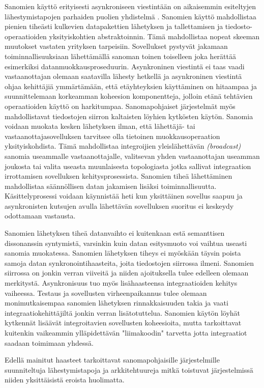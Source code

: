 Sanomien käyttö erityisesti asynkroniseen viestintään on aikaisemmin esiteltyjen lähestymistapojen parhaiden puolien yhdistelmä \citep[sivu~73]{Hohpe2004}.
Sanomien käyttö mahdollistaa pienien tiheästi kulkevien datapakettien lähetyksen ja tallettamisen ja tiedosto-operaatioiden yksityiskohtien abstraktoinnin. Tämä mahdollistaa nopeat skeeman muutokset vastaten yrityksen tarpeisiin.
Sovellukset pystyvät jakamaan toiminnallisuuksiaan lähettämällä sanoman toinen toiselleen joka herättää esimerkiksi datanmuokkausproseduurin. Asynkroninen viestintä ei taas vaadi vastaanottajan olemaan saatavilla lähesty hetkellä ja asynkroninen viestintä ohjaa kehittäjiä ymmärtämään, että etäyhteyksien käyttäminen on hitaampaa ja suunnittelemaan korkeamman koheesion komponentteja, jolloin etänä tehtävien operaatioiden käyttö on harkitumpaa.
Sanomapohjaiset järjestelmät myös mahdollistavat tiedostojen siirron kaltaisten löyhien kytkösten käytön. Sanomia voidaan muokata kesken lähetyksen ilman, että lähettäjä- tai vastaanottajasovelluksen tarvitsee olla tietoinen muokkausoperaation yksityiskohdista. Tämä mahdollistaa integroijien yleislähettävän \textit{(broadcast)} sanomia useammalle vastaanottajalle, valitsevan yhden vastaanottajan useamman joukosta tai valita useasta muunlaisesta topologiasta jotka sallivat integraation irrottamisen sovelluksen kehitysprosessista. 
Sanomien tiheä lähettäminen mahdollistaa säännöllisen datan jakamisen lisäksi toiminnallisuutta. Käsittelyprosessi voidaan käynnistää heti kun yksittäinen sovellus saapuu ja asynkronisten kutsujen avulla lähettävän sovelluksen suoritus ei keskeydy odottamaan vastausta.


Sanomien lähetyksen tiheä datanvaihto ei kuitenkaan estä semanttisen dissonanssin syntymistä, varsinkin kuin datan esitysmuoto voi vaihtua useasti sanomia muokatessa.
Sanomien lähetyksen tiheys ei myöskään täysin poista samoja datan synkronointihaasteita, joita tiedostojen siirrossa ilmeni. Sanomien siirrossa on jonkin verran viiveitä ja niiden ajoituksella tulee edelleen olemaan merkitystä.
Asynkronisuus tuo myös lisähaasteensa integraatioiden kehitys vaiheessa. Testaus ja sovellusten virheenpaikannus tulee olemaan monimutkaisempaa sanomien lähetyksen rinnakkaisuuden takia ja vaati integraatiokehittäjiltä jonkin verran lisätotuttelua.
Sanomien käytön löyhät kytkennät lisäävät integroitavien sovellusten koheesioita, mutta tarkoittavat kuitenkin vaikeammin ylläpidettävän "liimakoodin" tarvetta jotta integraatiot saadaan toimimaan yhdessä.

Edellä mainitut haasteet tarkoittavat sanomapohjaisille järjestelmille suunniteltuja lähestymistapoja ja arkkitehtuureja mitkä toistuvat järjestelmissä niiden yksittäisistä eroista huolimatta.

